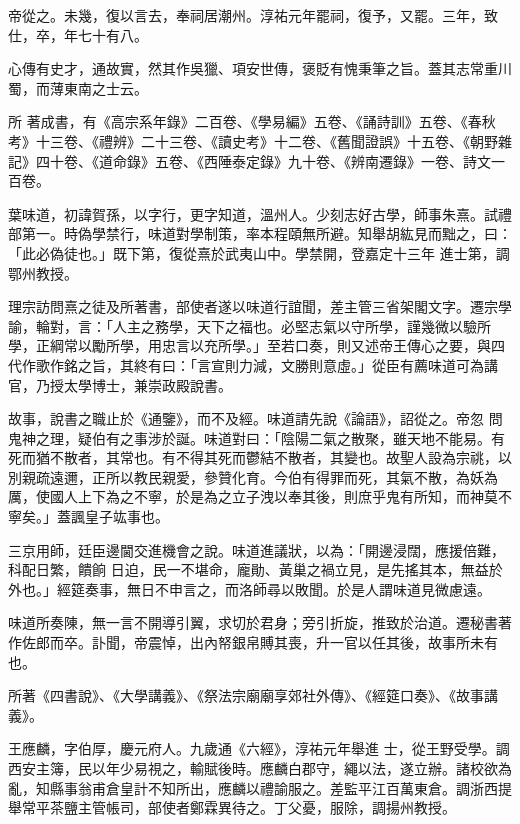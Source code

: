 \begin{pinyinscope}
 帝從之。未幾，復以言去，奉祠居潮州。淳祐元年罷祠，復予，又罷。三年，致仕，卒，年七十有八。



 心傳有史才，通故實，然其作吳獵、項安世傳，褒貶有愧秉筆之旨。蓋其志常重川蜀，而薄東南之士云。



 所
 著成書，有《高宗系年錄》二百卷、《學易編》五卷、《誦詩訓》五卷、《春秋考》十三卷、《禮辨》二十三卷、《讀史考》十二卷、《舊聞證誤》十五卷、《朝野雜記》四十卷、《道命錄》五卷、《西陲泰定錄》九十卷、《辨南遷錄》一卷、詩文一百卷。



 葉味道，初諱賀孫，以字行，更字知道，溫州人。少刻志好古學，師事朱熹。試禮部第一。時偽學禁行，味道對學制策，率本程頤無所避。知舉胡紘見而黜之，曰：「此必偽徒也。」既下第，復從熹於武夷山中。學禁開，登嘉定十三年
 進士第，調鄂州教授。



 理宗訪問熹之徒及所著書，部使者遂以味道行誼聞，差主管三省架閣文字。遷宗學諭，輪對，言：「人主之務學，天下之福也。必堅志氣以守所學，謹幾微以驗所學，正綱常以勵所學，用忠言以充所學。」至若口奏，則又述帝王傳心之要，與四代作歌作銘之旨，其終有曰：「言宣則力減，文勝則意虛。」從臣有薦味道可為講官，乃授太學博士，兼崇政殿說書。



 故事，說書之職止於《通鑒》，而不及經。味道請先說《論語》，詔從之。帝忽
 問鬼神之理，疑伯有之事涉於誕。味道對曰：「陰陽二氣之散聚，雖天地不能易。有死而猶不散者，其常也。有不得其死而鬱結不散者，其變也。故聖人設為宗祧，以別親疏遠邇，正所以教民親愛，參贊化育。今伯有得罪而死，其氣不散，為妖為厲，使國人上下為之不寧，於是為之立子洩以奉其後，則庶乎鬼有所知，而神莫不寧矣。」蓋諷皇子竑事也。



 三京用師，廷臣邊閫交進機會之說。味道進議狀，以為：「開邊浸闊，應援倍難，科配日繁，饋餉
 日迫，民一不堪命，龐勛、黃巢之禍立見，是先搖其本，無益於外也。」經筵奏事，無日不申言之，而洛師尋以敗聞。於是人謂味道見微慮遠。



 味道所奏陳，無一言不開導引翼，求切於君身；旁引折旋，推致於治道。遷秘書著作佐郎而卒。訃聞，帝震悼，出內帑銀帛賻其喪，升一官以任其後，故事所未有也。



 所著《四書說》、《大學講義》、《祭法宗廟廟享郊社外傳》、《經筵口奏》、《故事講義》。



 王應麟，字伯厚，慶元府人。九歲通《六經》，淳祐元年舉進
 士，從王野受學。調西安主簿，民以年少易視之，輸賦後時。應麟白郡守，繩以法，遂立辦。諸校欲為亂，知縣事翁甫倉皇計不知所出，應麟以禮諭服之。差監平江百萬東倉。調浙西提舉常平茶鹽主管帳司，部使者鄭霖異待之。丁父憂，服除，調揚州教授。




\end{pinyinscope}
